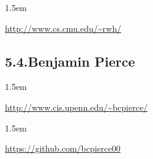 \documentclass[12pt,twoside]{article}
\begin{document}
\begin{mddefinitions}%


\begin{mdbmarginx}{}{}{}{1.5em}%
\begin{mddefdata}%
\href{http://www.cs.cmu.edu/~rwh/}{{\ttfamily http://\hspace{0pt}www.\hspace{0pt}cs.\hspace{0pt}cmu.\hspace{0pt}edu/\hspace{0pt}\textasciitilde{}rwh/\hspace{0pt}}}%
\end{mddefdata}%
\end{mdbmarginx}%
\end{mddefinitions}%

\subsection{5.4.\hspace*{0.5em}Benjamin Pierce}\label{sec-benjamin-pierce}%

\begin{mddefinitions}%


\begin{mdbmarginx}{}{}{}{1.5em}%
\begin{mddefdata}%
\href{http://www.cis.upenn.edu/~bcpierce/}{{\ttfamily http://\hspace{0pt}www.\hspace{0pt}cis.\hspace{0pt}upenn.\hspace{0pt}edu/\hspace{0pt}\textasciitilde{}bcpierce/\hspace{0pt}}}
\end{mddefdata}%
\end{mdbmarginx}%


\begin{mdbmarginx}{}{}{}{1.5em}%
\begin{mddefdata}%
\href{https://github.com/bcpierce00}{{\ttfamily https://\hspace{0pt}github.\hspace{0pt}com/\hspace{0pt}bcpierce00}}%
\end{mddefdata}%
\end{mdbmarginx}%
\end{mddefinitions}%
\end{document}
